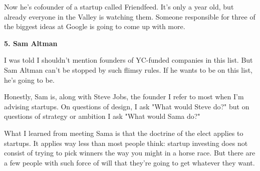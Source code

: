Now he's cofounder of a startup
                  called Friendfeed. It's only a year old, but already everyone
                  in the Valley is watching them. Someone responsible for three
                  of the biggest ideas at Google is going to come up with
                  more.

\textbf{5. Sam Altman}

I was told I
                  shouldn't mention founders of YC-funded companies in this
                  list. But Sam Altman can't be stopped by such flimsy rules. If
                  he wants to be on this list, he's going to be.

Honestly,
                  Sam is, along with Steve Jobs, the founder I refer to most
                  when I'm advising startups. On questions of design, I ask
                  "What would Steve do?" but on questions of strategy or
                  ambition I ask "What would Sama do?"

What I learned
                  from meeting Sama is that the doctrine of the elect applies to
                  startups. It applies way less than most people think: startup
                  investing does not consist of trying to pick winners the way
                  you might in a horse race. But there are a few people with
                  such force of will that they're going to get whatever they
                  want.


              
            
          
            
              
                


                  
              
            
          
